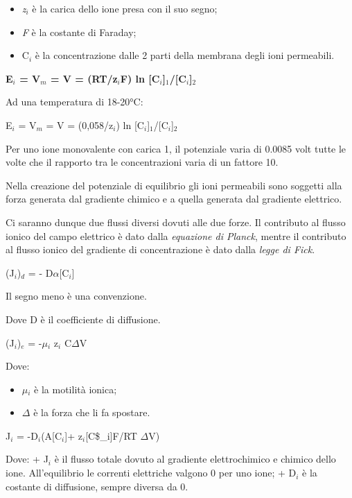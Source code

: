 \documentclass[]{article}
\begin{document}
\begin{itemize}
\itemsep1pt\parskip0pt
\item
  \emph{z\(_i\)} è la carica dello ione presa con il suo segno;
\item
  \emph{F} è la costante di Faraday;
\item
  C\(_i\) è la concentrazione dalle 2 parti della membrana degli ioni
  permeabili.
\end{itemize}

\textbf{E\(_i\) = V\(_m\) = V = (RT/z\(_i\)F) ln
{[}C\(_i\){]}\(_1\)/{[}C\(_i\){]}\(_2\)}

Ad una temperatura di 18-20°C:

E\(_i\) = V\(_m\) = V = (0,058/z\(_i\)) ln
{[}C\(_i\){]}\(_1\)/{[}C\(_i\){]}\(_2\)

Per uno ione monovalente con carica 1, il potenziale varia di 0.0085
volt tutte le volte che il rapporto tra le concentrazioni varia di un
fattore 10.

Nella creazione del potenziale di equilibrio gli ioni permeabili sono
soggetti alla forza generata dal gradiente chimico e a quella generata
dal gradiente elettrico.

Ci saranno dunque due flussi diversi dovuti alle due forze. Il
contributo al flusso ionico del campo elettrico è dato dalla
\emph{equazione di Planck}, mentre il contributo al flusso ionico del
gradiente di concentrazione è dato dalla \emph{legge di Fick}.

(J\(_i\))\(_d\) = - D\(\alpha\){[}C\(_i\){]}

Il segno meno è una convenzione.

Dove D è il coefficiente di diffusione.

(J\(_i\))\(_e\) = -\(\mu\)\(_i\) z\(_i\) C\(\Delta\)V

Dove:

\begin{itemize}
\itemsep1pt\parskip0pt
\item
  \(\mu\)\(_i\) è la motilità ionica;
\item
  \(\Delta\) è la forza che li fa spostare.
\end{itemize}

J\(_i\) = -D\(_i\)(A{[}C\(_i\){]}+ z\(_i\){[}C\$\_i{]}F/RT \(\Delta\)V)

Dove: + J\(_i\) è il flusso totale dovuto al gradiente elettrochimico e
chimico dello ione. All'equilibrio le correnti elettriche valgono 0 per
uno ione; + D\(_i\) è la costante di diffusione, sempre diversa da 0.
\end{document}
